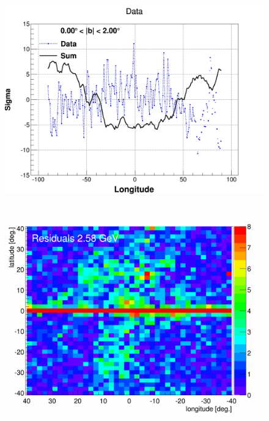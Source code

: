 \begin{figure}[h]
  \centering
  \begin{minipage}[h]{0.45\textwidth}
  	\centering
	\includegraphics[width=1.\linewidth]{pic/results/BKGonly_weniger_sum_0-2.png}
  	\subcaption{}
  	\label{fig:weniger_plot}
  \end{minipage}
  \hfill
  \begin{minipage}[h]{0.45\textwidth}
	  \centering
	  \includegraphics[width=1.\linewidth]{pic/results/BKGonly_halo_residuals.png}

\end{minipage}
\end{figure}
